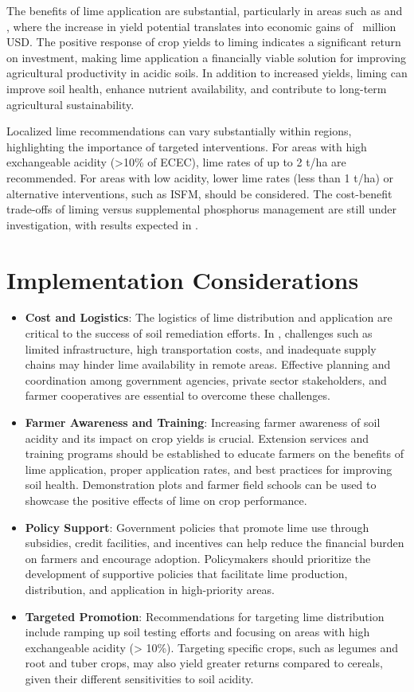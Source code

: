 \documentclass[openany
]{book}
\begin{document}
The benefits of lime application are substantial, particularly in areas such as \RegionX and \RegionY, where the increase in yield potential translates into economic gains of \EconomicValue\ million USD. The positive response of crop yields to liming indicates a significant return on investment, making lime application a financially viable solution for improving agricultural productivity in acidic soils. In addition to increased yields, liming can improve soil health, enhance nutrient availability, and contribute to long-term agricultural sustainability.

Localized lime recommendations can vary substantially within regions, highlighting the importance of targeted interventions. For areas with high exchangeable acidity (>10\% of ECEC), lime rates of up to 2 t/ha are recommended. For areas with low acidity, lower lime rates (less than 1 t/ha) or alternative interventions, such as ISFM, should be considered. The cost-benefit trade-offs of liming versus supplemental phosphorus management are still under investigation, with results expected in \Year.

\section*{Implementation Considerations}
\begin{itemize}
\item \textbf{Cost and Logistics}: The logistics of lime distribution and application are critical to the success of soil remediation efforts. In \CountryName, challenges such as limited infrastructure, high transportation costs, and inadequate supply chains may hinder lime availability in remote areas. Effective planning and coordination among government agencies, private sector stakeholders, and farmer cooperatives are essential to overcome these challenges.
\item \textbf{Farmer Awareness and Training}: Increasing farmer awareness of soil acidity and its impact on crop yields is crucial. Extension services and training programs should be established to educate farmers on the benefits of lime application, proper application rates, and best practices for improving soil health. Demonstration plots and farmer field schools can be used to showcase the positive effects of lime on crop performance.
\item \textbf{Policy Support}: Government policies that promote lime use through subsidies, credit facilities, and incentives can help reduce the financial burden on farmers and encourage adoption. Policymakers should prioritize the development of supportive policies that facilitate lime production, distribution, and application in high-priority areas.
\item \textbf{Targeted Promotion}: Recommendations for targeting lime distribution include ramping up soil testing efforts and focusing on areas with high exchangeable acidity (> 10\%). Targeting specific crops, such as legumes and root and tuber crops, may also yield greater returns compared to cereals, given their different sensitivities to soil acidity.
\end{itemize}
\end{document}
